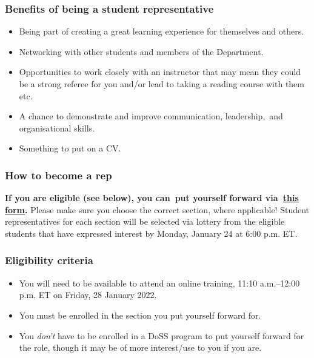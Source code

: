 \documentclass[
  openany]{book}
\begin{document}
\hypertarget{benefits-of-being-a-student-representative}{%
\subsubsection{Benefits of being a student representative}\label{benefits-of-being-a-student-representative}}

\begin{itemize}
\item
  Being part of creating a great learning experience for themselves and others.
\item
  Networking with other students and members of the Department.
\item
  Opportunities to work closely with an instructor that may mean they could be a strong referee for you and/or lead to taking a reading course with them etc.
\item
  A chance to demonstrate and improve communication, leadership,~and organisational skills.
\item
  Something to put on a CV.
\end{itemize}

\hypertarget{how-to-become-a-rep}{%
\subsubsection{How to become a rep}\label{how-to-become-a-rep}}

\textbf{If you are eligible (see below), you can~put yourself forward via~\href{https://forms.office.com/r/3ZjP0TBpQd}{this form}.} Please make sure you choose the correct section, where applicable! Student representatives for each section will be selected via lottery from the eligible students that have expressed interest by Monday, January 24 at 6:00 p.m. ET.~~

\hypertarget{eligibility-criteria}{%
\subsubsection{Eligibility criteria}\label{eligibility-criteria}}

\begin{itemize}
\item
  You will need to be available to attend an online training, 11:10 a.m.--12:00 p.m. ET on Friday, 28 January 2022.
\item
  You must be enrolled in the section you put yourself forward for.
\item
  You \emph{don't} have to be enrolled in a DoSS program to put yourself forward for the role, though it may be of more interest/use to you if you are.
\end{itemize}
\end{document}
